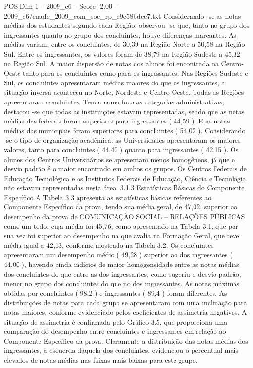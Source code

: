 \begin{textsample}{POS Dim 1 – 2009\_c6 – Score -2.00 – 2009\_c6/enade\_2009\_com\_soc\_rp\_c9c58bdcc7.txt}
Considerando -se as notas médias dos estudantes segundo cada Região, observou -se que, tanto no grupo dos ingressantes quanto no grupo dos concluintes, houve diferenças marcantes.
As médias variam, entre os concluintes, de 30,39 na Região Norte a 50,58 na Região Sul.
Entre os ingressantes, os valores foram de 38,79 na Região Sudeste a 45,32 na Região Sul.
A maior dispersão de notas dos alunos foi encontrada na Centro-Oeste tanto para os concluintes como para os ingressantes.
Nas Regiões Sudeste e Sul, os concluintes apresentaram médias maiores do que os ingressantes, a situação inversa aconteceu no Norte, Nordeste e Centro-Oeste.
Todas as Regiões apresentaram concluintes.
Tendo como foco as categorias administrativas, destacou -se que todas as instituições estavam representadas, sendo que as notas médias das federais foram superiores para ingressantes ( 44,59 ).
E as notas médias das municipais foram superiores para concluintes ( 54,02 ).
Considerando -se o tipo de organização acadêmica, as Universidades apresentaram os maiores valores, tanto para concluintes ( 44,40 ) quanto para ingressantes ( 42,15 ).
Os alunos dos Centros Universitários se apresentam menos homogêneos, já que o desvio padrão é o maior encontrado em ambos os grupos.
Os Centros Federais de Educação Tecnológica e os Institutos Federais de Educação, Ciência e Tecnologia não estavam representadas nesta área. 3.1.3 Estatísticas Básicas do Componente Específico A Tabela 3.3 apresenta as estatísticas básicas referentes ao Componente Específico da prova, tendo sua média geral, de 47,02, superior ao desempenho da prova de COMUNICAÇÃO SOCIAL – RELAÇÕES PÚBLICAS como um todo, cuja média foi 45,76, como apresentado na Tabela 3.1, que por sua vez foi superior ao desempenho na que avalia na Formação Geral, que teve média igual a 42,13, conforme mostrado na Tabela 3.2.
Os concluintes apresentaram um desempenho médio ( 49,28 ) superior ao dos ingressantes ( 44,00 ), havendo ainda indícios de maior homogeneidade entre as notas médias dos concluintes do que entre as dos ingressantes, como sugeriu o desvio padrão, menor no grupo dos concluintes do que no dos ingressantes.
As notas máximas obtidas por concluintes ( 98,2 ) e ingressantes ( 89,4 ) foram diferentes.
As distribuições de notas para cada grupo se apresentaram com uma inclinação para notas maiores, conforme evidenciado pelos coeficientes de assimetria negativos.
A situação de assimetria é confirmada pelo Gráfico 3.5, que proporciona uma comparação do desempenho entre concluintes e ingressantes em relação ao Componente Específico da prova.
Claramente a distribuição das notas médias dos ingressantes, à esquerda daquela dos concluintes, evidenciou o percentual mais elevados de notas médias nas faixas mais baixas para este grupo.

\end{textsample}
